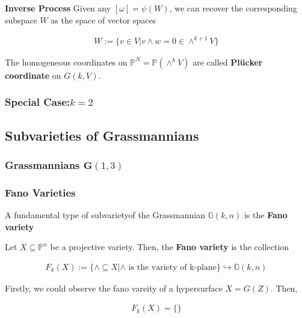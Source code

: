 \documentclass[Total.tex]{subfiles}
\begin{document}
		\textbf{Inverse Process} Given any $[\omega]=\psi(W)$, we can recover the corresponding subspace $W$ as the space of vector spaces
		
		\begin{gather*}
			W:=\{v\in V|v\wedge w=0\in \wedge^{k+1}V\}
		\end{gather*}
		
		\begin{Def}
			The homogeneous coordinates on $\mathbb{P}^N=\mathbb{P}(\wedge^k V)$ are called \textbf{Plücker coordinate} on $G(k,V)$.
			
			
		\end{Def}
		
		\subsubsection{Special Case:$k=2$}
		
		\subsection{Subvarieties of Grassmannians}
		
		\subsubsection{Grassmannians $\mathbf{G}(1,3)$}
		
		
		\subsubsection{Fano Varieties}
		
		A fundamental type of subvarietyof the Grassmannian $\mathbb{G}(k,n)$ is the \textbf{Fano variety}
		
		\begin{Def}
			Let $X\subseteq \mathbb{P}^n$ be a projective variety. Then, the \textbf{Fano variety} is the collection
			
			\begin{gather*}
				F_k(X):=\{\wedge\subseteq X|\wedge\mbox{ is the variety of k-plane}\} \hookrightarrow \mathbb{G}(k,n)
			\end{gather*}
		\end{Def}
		
		Firstly, we could observe the fano vareity of a hypersurface $X=G(Z)$. Then, 
		
		\begin{gather*}
			F_k(X)=\{\}
		\end{gather*}
		
\end{document}
